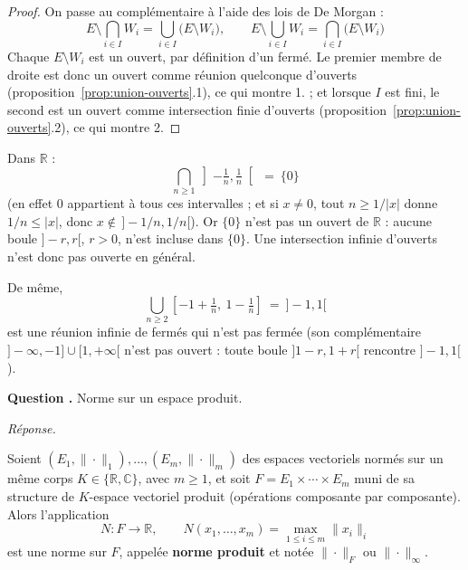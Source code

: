 \documentclass[11pt]{article}
\newcounter{qnum}
\newcommand{\question}[1]{%
\stepcounter{qnum}%
\bigskip
\noindent\textbf{Question \theqnum.} #1\par}
\newcommand{\reponse}{\noindent\textit{Réponse.}\ }
\begin{document}
\begin{proof}
On passe au complémentaire à l'aide des lois de De Morgan :
\[E\setminus\bigcap_{i\in I}W_i = \bigcup_{i\in I}\big(E\setminus W_i\big), \qquad E\setminus\bigcup_{i\in I}W_i = \bigcap_{i\in I}\big(E\setminus W_i\big)\]
Chaque $E\setminus W_i$ est un ouvert, par définition d'un fermé. Le premier membre de droite est donc un ouvert comme réunion quelconque d'ouverts (proposition~\ref{prop:union-ouverts}.1), ce qui montre 1. ; et lorsque $I$ est fini, le second est un ouvert comme intersection finie d'ouverts (proposition~\ref{prop:union-ouverts}.2), ce qui montre 2.
\end{proof}

\begin{remarque}
Dans $\mathbb{R}$ :
\[\bigcap_{n\geq 1}\left]-\tfrac1n,\tfrac1n\right[ \ = \ \{0\}\]
(en effet $0$ appartient à tous ces intervalles ; et si $x\neq 0$, tout $n\geq 1/|x|$ donne $1/n\leq|x|$, donc $x\notin\,]-1/n,1/n[$). Or $\{0\}$ n'est pas un ouvert de $\mathbb{R}$ : aucune boule $]-r,r[$, $r>0$, n'est incluse dans $\{0\}$. Une intersection infinie d'ouverts n'est donc pas ouverte en général.

De même,
\[\bigcup_{n\geq 2}\left[-1+\tfrac1n,\ 1-\tfrac1n\right] \ = \ ]-1,1[\]
est une réunion infinie de fermés qui n'est pas fermée (son complémentaire $]-\infty,-1]\cup[1,+\infty[$ n'est pas ouvert : toute boule $]1-r,1+r[$ rencontre $]-1,1[$).
\end{remarque}

\question{Norme sur un espace produit.}
\reponse

\begin{prop}
\label{prop:norme-produit}
Soient $(E_1,\|\cdot\|_1),\dots,(E_m,\|\cdot\|_m)$ des espaces vectoriels normés sur un même corps $K\in\{\mathbb{R},\mathbb{C}\}$, avec $m\geq 1$, et soit $F=E_1\times\cdots\times E_m$ muni de sa structure de $K$-espace vectoriel produit (opérations composante par composante). Alors l'application
\[N : F\to\mathbb{R}, \qquad N(x_1,\dots,x_m) = \max_{1\leq i\leq m}\|x_i\|_i\]
est une norme sur $F$, appelée \textbf{norme produit} et notée $\|\cdot\|_F$ ou $\|\cdot\|_\infty$.
\end{prop}
\end{document}
